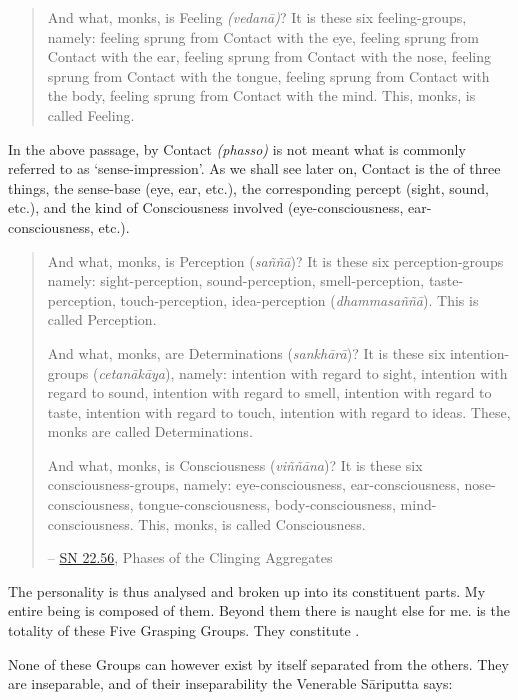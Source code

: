 \begin{quote}
And what, monks, is Feeling \emph{(vedanā)}? It is these six feeling-groups, namely: feeling sprung from Contact with the eye, feeling sprung from Contact with the ear, feeling sprung from Contact with the nose, feeling sprung from Contact with the tongue, feeling sprung from Contact with the body, feeling sprung from Contact with the mind. This, monks, is called Feeling.
\end{quote}

In the above passage, by Contact \emph{(phasso)} is not meant what is commonly referred to as `sense-impression'. As we shall see later on, Contact is the  of three things, the sense-base (eye, ear, etc.), the corresponding percept (sight, sound, etc.), and the kind of Consciousness involved (eye-consciousness, ear-consciousness, etc.).

\clearpage

\begin{quote}
And what, monks, is Perception (\emph{saññā})? It is these six perception-groups namely: sight-perception, sound-perception, smell-perception, taste-perception, touch-perception, idea-perception (\emph{dhammasaññā}). This is called Perception.

And what, monks, are Determinations (\emph{sankhārā})? It is these six intention-groups (\emph{cetanākāya}), namely: intention with regard to sight, intention with regard to sound, intention with regard to smell, intention with regard to taste, intention with regard to touch, intention with regard to ideas. These, monks are called Determinations.

And what, monks, is Consciousness (\emph{viññāna})? It is these six consciousness-groups, namely: eye-consciousness, ear-consciousness, nose-consciousness, tongue-consciousness, body-consciousness, mind-consciousness. This, monks, is called Consciousness.

 -- \href{https://suttacentral.net/sn22.56/en/bodhi}{SN 22.56}, Phases of the Clinging Aggregates
\end{quote}

The personality is thus analysed and broken up into its constituent parts. My entire being is composed of them. Beyond them there is naught else for me.  is the totality of these Five Grasping Groups. They constitute .

None of these Groups can however exist by itself separated from the others. They are inseparable, and of their inseparability the Venerable Sāriputta says:

